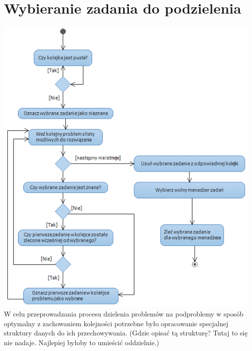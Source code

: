\documentclass[12pt,a4paper,titlepage]{report}
\begin{document}
		\section{Wybieranie zadania do podzielenia}
		\includegraphics[width=\textwidth]{img/diagram_queue.png}
		W celu przeprowadzania procesu dzielenia problemów na podproblemy w sposób optymalny z zachowaniem kolejności
		potrzebne było opracowanie specjalnej struktury danych do ich przechowywania. (Gdzie opisać tą strukturę?
		Tutaj to się nie nadaje. Najlepiej byłoby to umieścić oddzielnie.)
		
\end{document}

